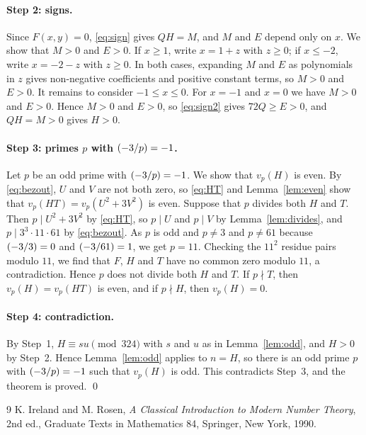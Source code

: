 \documentclass[11pt]{article}
\newcommand{\leg}[2]{\mathchoice{\biggl(\dfrac{#1}{#2}\biggr)}{(#1/#2)}{(#1/#2)}{(#1/#2)}}
\begin{document}
\paragraph{Step 2: signs.} Since $F(x,y)=0$, \eqref{eq:sign} gives $QH=M$, and $M$ and $E$ depend only on $x$. We show that $M>0$ and $E>0$. If $x\geq1$, write $x=1+z$ with $z\geq0$; if $x\leq-2$, write $x=-2-z$ with $z\geq0$. In both cases, expanding $M$ and $E$ as polynomials in $z$ gives non-negative coefficients and positive constant terms, so $M>0$ and $E>0$. It remains to consider $-1\leq x\leq0$. For $x=-1$ and $x=0$ we have $M>0$ and $E>0$. Hence $M>0$ and $E>0$, so \eqref{eq:sign2} gives $72Q\geq E>0$, and $QH=M>0$ gives $H>0$.

\paragraph{\texorpdfstring{Step 3: primes $p$ with $\leg{-3}{p}=-1$.}{Step 3: inert primes.}} Let $p$ be an odd prime with $\leg{-3}{p}=-1$. We show that $v_p(H)$ is even. By \eqref{eq:bezout}, $U$ and $V$ are not both zero, so \eqref{eq:HT} and Lemma~\ref{lem:even} show that $v_p(HT)=v_p(U^2+3V^2)$ is even. Suppose that $p$ divides both $H$ and $T$. Then $p\mid U^2+3V^2$ by \eqref{eq:HT}, so $p\mid U$ and $p\mid V$ by Lemma~\ref{lem:divides}, and $p\mid 3^{3}\cdot 11\cdot 61$ by \eqref{eq:bezout}. As $p$ is odd and $p\neq3$ and $p\neq61$ because $\leg{-3}{3}=0$ and $\leg{-3}{61}=1$, we get $p=11$. Checking the $11^2$ residue pairs modulo $11$, we find that $F$, $H$ and $T$ have no common zero modulo $11$, a contradiction. Hence $p$ does not divide both $H$ and $T$. If $p\nmid T$, then $v_p(H)=v_p(HT)$ is even, and if $p\nmid H$, then $v_p(H)=0$.

\paragraph{Step 4: contradiction.} By Step~1, $H\equiv su\pmod{324}$ with $s$ and $u$ as in Lemma~\ref{lem:odd}, and $H>0$ by Step~2. Hence Lemma~\ref{lem:odd} applies to $n=H$, so there is an odd prime $p$ with $\leg{-3}{p}=-1$ such that $v_p(H)$ is odd. This contradicts Step~3, and the theorem is proved.
\qed

\begin{thebibliography}{9}
 K. Ireland and M. Rosen, \emph{A Classical Introduction to Modern Number Theory}, 2nd ed., Graduate Texts in Mathematics 84, Springer, New York, 1990.
\end{thebibliography}
\end{document}
